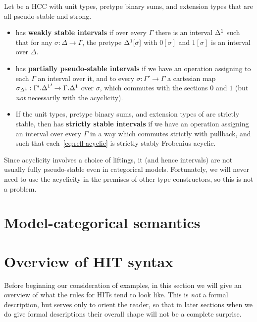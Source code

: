 \documentclass{amsart}
\begin{document}
\begin{defn}
  Let \E be a HCC with unit types, pretype binary sums, and extension types that are all pseudo-stable and strong.
  \begin{itemize}
  \item \E has \textbf{weakly stable intervals} if over every $\Gamma$ there is an interval ${\Delta^1}$ such that for any $\sigma:\Delta\to\Gamma$, the pretype ${\Delta^1}[\sigma]$ with $0[\sigma]$ and $1[\sigma]$ is an interval over $\Delta$.
  \item \E has \textbf{partially pseudo-stable intervals} if we have an operation assigning to each $\Gamma$ an interval over it, and to every $\sigma:\Gamma'\to\Gamma$ a cartesian map $\sigma_{\Delta^1} : \Gamma'.{\Delta^1}' \to \Gamma.{\Delta^1}$ over $\sigma$, which commutes with the sections $0$ and $1$ (but \emph{not} necessarily with the acyclicity).
  \item If the unit types, pretype binary sums, and extension types of \E are strictly stable, then \E has \textbf{strictly stable intervals} if we have an operation assigning an interval over every $\Gamma$ in a way which commutes strictly with pullback, and such that each~\eqref{eq:refl-acyclic} is strictly stably Frobenius acyclic.
  \end{itemize}
\end{defn}

Since acyclicity involves a choice of liftings, it (and hence intervals) are not usually fully pseudo-stable even in categorical models.
Fortunately, we will never need to use the acyclicity in the premises of other type constructors, so this is not a problem.


\section{Model-categorical semantics}
\label{sec:model-categories}



\section{Overview of HIT syntax}
\label{sec:syntax}

Before beginning our consideration of examples, in this section we will give an overview of what the rules for HITs tend to look like.
This is \emph{not} a formal description, but serves only to orient the reader, so that in later sections when we do give formal descriptions their overall shape will not be a complete surprise.
\end{document}
